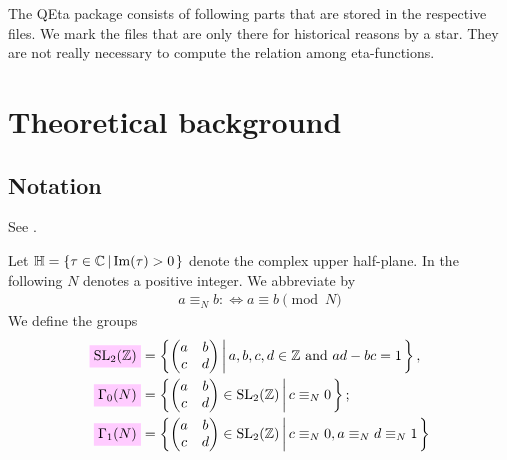 \documentclass{article}
\begin{document}
The QEta package consists of following parts that are stored in the
respective  files. We mark the files that are only
there for historical reasons by a star. They are not really necessary
to compute the relation among eta-functions.

%

\section{Theoretical background}

\subsection{Notation}
\begin{Hemmecke}
  See \cite{HemmeckePauleRadu_IntegralBasis_2021}.
\end{Hemmecke}

Let $\setH=\SetDef{\tau\in \setC}{\mathrm{Im}(\tau)>0}$ denote the
complex upper half-plane.
%
In the following $N$ denotes a positive integer. We abbreviate
 by
\begin{gather}
  a \equiv_N b :\iff a \equiv b \pmod{N}
\end{gather}
%
We define the groups
\begin{align}
  \defineNotation[SL2Z]{\SL2Z}
  &=
  \SetDef{
    \begin{pmatrix}
      a & b\\
      c & d\\
    \end{pmatrix}}{a,b,c,d\in\setZ \text{ and } ad-bc=1},
  \label{eq:SL2Z}
  \\
  \defineNotation[Gamma0N]{\Gamma_0(N)}
  &=
  \SetDef{
    \begin{pmatrix}
      a & b\\
      c & d\\
    \end{pmatrix} \in \SL2Z}{c \equiv_N 0};
  \label{eq:Gamma0}
  \\
  \defineNotation[Gamma1N]{\Gamma_1(N)}
  &=
  \SetDef{
    \begin{pmatrix}
      a & b\\
      c & d
    \end{pmatrix} \in \SL2Z}{c \equiv_N 0, a \equiv_N d \equiv_N 1}
  \label{eq:Gamma1}
\end{align}
\end{document}
